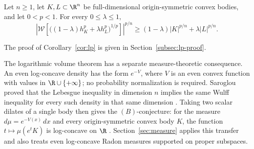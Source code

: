 \begin{corollary}
\label{cor:lp}
Let $n\ge1$, let $K,L\subset\R^n$ be full-dimensional origin-symmetric
convex bodies, and let $0<p<1$. For every $0\le\lambda\le1$,
\begin{equation}\label{eq:lp}
 \left|\mathcal W\!\left[
  \bigl((1-\lambda)h_K^p+\lambda h_L^p\bigr)^{1/p}
 \right]\right|^{p/n}
 \ge (1-\lambda)|K|^{p/n}+\lambda|L|^{p/n}.
\end{equation}
\end{corollary}

The proof of Corollary~\ref{cor:lp} is given in
Section~\ref{subsec:lp-proof}.


The logarithmic volume theorem has a separate measure-theoretic consequence.
An even log-concave density has the form $e^{-V}$, where $V$ is an even
convex function with values in $\R\cup\{+\infty\}$; no probability
normalization is required. Saroglou proved that the Lebesgue inequality in
dimension $n$ implies the same Wulff inequality for every such density in
that same dimension \cite[Theorem~3.1]{Saroglou2016}.
Taking two scalar dilates of a single body then gives the $(B)$-conjecture:
for the measure $d\mu=e^{-V(x)}\,dx$ and every origin-symmetric convex body
$K$, the function $t\mapsto\mu(e^tK)$ is log-concave on $\R$
\cite[Corollary~3.2]{Saroglou2016}.
Section~\ref{sec:measure} applies this transfer and also treats even
log-concave Radon measures supported on proper subspaces.

